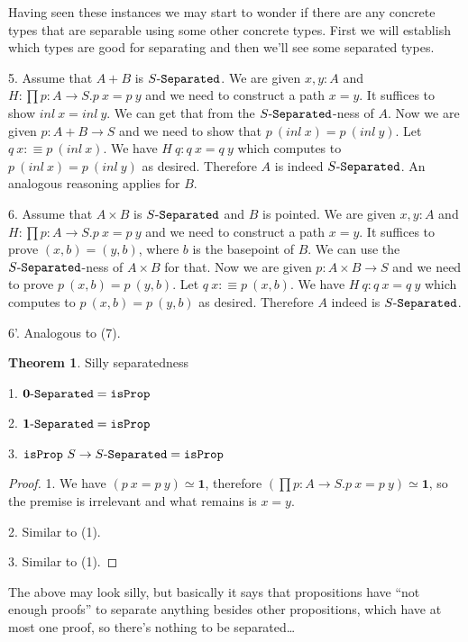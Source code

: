 \documentclass[11pt]{article}
\theoremstyle{definition}
\newtheorem{theorem}{Theorem}[section]
\newcommand{\text}[1]{\texttt{#1}}
\renewcommand{\(}{\left(}
\renewcommand{\)}{\right)}
\newcommand{\defn}{:\equiv}
\newcommand{\isProp}{\text{isProp}}
\newcommand{\apl}[2]{#1\ #2}
\newcommand{\hequiv}[2]{#1 \simeq #2}
\newcommand{\Empty}{\mathbf{0}}
\newcommand{\Unit}{\mathbf{1}}
\newcommand{\dprod}[2]{\prod #1.#2}
\newcommand{\prodt}[2]{#1 \times #2}
\newcommand{\sumt}[2]{#1 + #2}
\begin{document}
Having seen these instances we may start to wonder if there are any concrete types that are separable using some other concrete types. First we will establish which types are good for separating and then we'll see some separated types.

5. Assume that $\sumt{A}{B}$ is $\Separated{S}$. We are given $x, y : A$ and $H : \dprod{p : A \to S}{\apl{p}{x} = \apl{p}{y}}$ and we need to construct a path $x = y$. It suffices to show $\apl{inl}{x} = \apl{inl}{y}$. We can get that from the $\Separated{S}$-ness of $A$. Now we are given $p : \sumt{A}{B} \to S$ and we need to show that $\apl{p}{(\apl{inl}{x})} = \apl{p}{(\apl{inl}{y})}$. Let $\apl{q}{x} \defn \apl{p}{(\apl{inl}{x})}$. We have $\apl{H}{q} : \apl{q}{x} = \apl{q}{y}$ which computes to $\apl{p}{(\apl{inl}{x})} = \apl{p}{(\apl{inl}{y})}$ as desired. Therefore $A$ is indeed $\Separated{S}$. An analogous reasoning applies for $B$.

6. Assume that $\prodt{A}{B}$ is $\Separated{S}$ and $B$ is pointed. We are given $x, y : A$ and $H : \dprod{p : A \to S}{\apl{p}{x} = \apl{p}{y}}$ and we need to construct a path $x = y$. It suffices to prove $(x, b) = (y, b)$, where $b$ is the basepoint of $B$. We can use the $\Separated{S}$-ness of $\prodt{A}{B}$ for that. Now we are given $p : \prodt{A}{B} \to S$ and we need to prove $\apl{p}{(x, b)} = \apl{p}{(y, b)}$. Let $\apl{q}{x} \defn \apl{p}{(x, b)}$. We have $\apl{H}{q} : \apl{q}{x} = \apl{q}{y}$ which computes to $\apl{p}{(x, b)} = \apl{p}{(y, b)}$ as desired. Therefore $A$ indeed is $\Separated{S}$.

6'. Analogous to (7).

\begin{theorem} Silly separatedness

1. $\Separated{\Empty} = \isProp$

2. $\Separated{\Unit} = \isProp$

3. $\apl{\isProp}{S} \to \Separated{S} = \isProp$

\end{theorem}
\begin{proof}
1. We have $\hequiv{(\apl{p}{x} = \apl{p}{y})}{\Unit}$, therefore $\hequiv{(\dprod{p : A \to S}{\apl{p}{x} = \apl{p}{y}})}{\Unit}$, so the premise is irrelevant and what remains is $x = y$.

2. Similar to (1).

3. Similar to (1).
\end{proof}

The above may look silly, but basically it says that propositions have ``not enough proofs'' to separate anything besides other propositions, which have at most one proof, so there's nothing to be separated\dots
\end{document}
